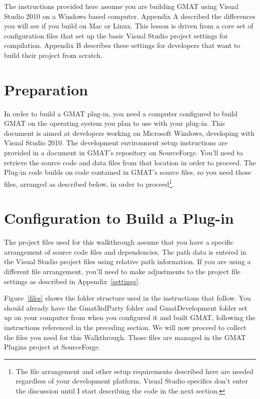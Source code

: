 \documentclass[10pt,letterpaper]{article}
\begin{document}
The instructions provided here assume you are building GMAT using Visual Studio 2010 on a Windows based computer.  Appendix A described the differences you will see if you build on Mac or Linux.  This lesson is driven from a core set of configuration files that set up the basic Visual Studio project settings for compilation.  Appendix B describes these settings for developers that want to build their project from scratch.

\section{Preparation}

In order to build a GMAT plug-in, you need a computer configured to build GMAT on the operating system you plan to use with your plug-in.  This document is aimed at developers working on Microsoft Windows, developing with Visual Studio 2010.  The development environment setup instructions are provided in a document in GMAT's repository on SourceForge\cite{vsSetup}.  You'll need to retrieve the source code and data files from that location in order to proceed.  The Plug-in code builds on code contained in GMAT's source files, so you need those files, arranged as described below, in order to proceed\footnote{The file arrangement and other setup requirements described here are needed regardless of your development platform.  Visual Studio specifics don't enter the discussion until I start describing the code in the next section.}.

\section{Configuration to Build a Plug-in}

The project files used for this walkthrough assume that you have a specific arrangement of source code files and dependencies.  The path data is entered in the Visual Studio project files using relative path information.  If you are using a different file arrangement, you'll need to make adjustments to the project file settings as described in Appendix~\ref{settings}.

Figure~\ref{files} shows the folder structure used in the instructions that follow.  You should already have the Gmat3rdParty folder and GmatDevelopment folder set up on your computer from when you configured it and built GMAT, following the instructions referenced in the preceding section.  We will now proceed to collect the files you need for this Walkthrough.  Those files are managed in the GMAT Plugins project at SourceForge.
\end{document}
